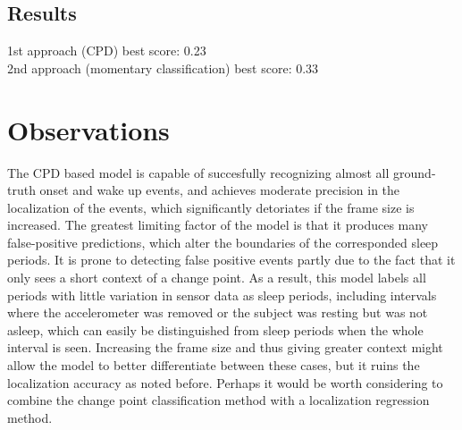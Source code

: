 \documentclass{article}
\begin{document}
\subsection{Results}
1st approach (CPD) best score: 0.23\\
2nd approach (momentary classification) best score: 0.33

\section{Observations}

The CPD based model is capable of succesfully recognizing almost all ground-truth onset and wake up events, and achieves moderate precision in the localization of the events, which significantly detoriates if the frame size is increased. The greatest limiting factor of the model is that it produces many false-positive predictions, which alter the boundaries of the corresponded sleep periods. It is prone to detecting false positive events partly due to the fact that it only sees a short context of a change point. As a result, this model labels all periods with little variation in sensor data as sleep periods, including intervals where the accelerometer was removed or the subject was resting but was not asleep, which can easily be distinguished from sleep periods when the whole interval is seen. Increasing the frame size and thus giving greater context might allow the model to better differentiate between these cases, but it ruins the localization accuracy as noted before. Perhaps it would be worth considering to combine the change point classification method with a localization regression method.






\end{document}

